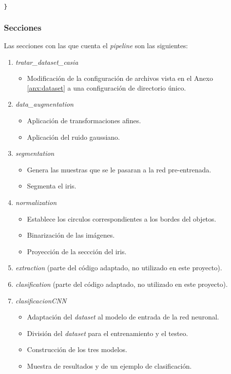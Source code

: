 {\begin{lstlisting}[language=Python]
}
\end{lstlisting}

\subsubsection{Secciones}

Las secciones con las que cuenta el \textit{pipeline} son las siguientes:

\begin{enumerate}
    \item \textit{tratar\_dataset\_casia}
    \begin{itemize}
        \item Modificación de la configuración de archivos vista en el Anexo \ref{anx:dataset} a una configuración de directorio único.
    \end{itemize}
    \item \textit{data\_augmentation}
    \begin{itemize}
        \item Aplicación de transformaciones afines.
        \item Aplicación del ruido gaussiano.
    \end{itemize}
    \item \textit{segmentation}
    \begin{itemize}
        \item Genera las muestras que se le pasaran a la red pre-entrenada.
        \item Segmenta el iris.
    \end{itemize}
    \item \textit{normalization}
    \begin{itemize}
        \item Establece los circulos correspondientes a los bordes del objetos.
        \item Binarización de las imágenes.
        \item Proyección de la seccción del iris.
    \end{itemize}
    \item \textit{extraction} (parte del código adaptado, no utilizado en este proyecto).
    \item \textit{clasification} (parte del código adaptado, no utilizado en este proyecto).
    \item \textit{clasificacionCNN}
    \begin{itemize}
        \item Adaptación del \textit{dataset} al modelo de entrada de la red neuronal.
        \item División del \textit{dataset} para el entrenamiento y el testeo.
        \item Construcción de los tres modelos.
        \item Muestra de resultados y de un ejemplo de clasificación.
    \end{itemize}
\end{enumerate}


}
